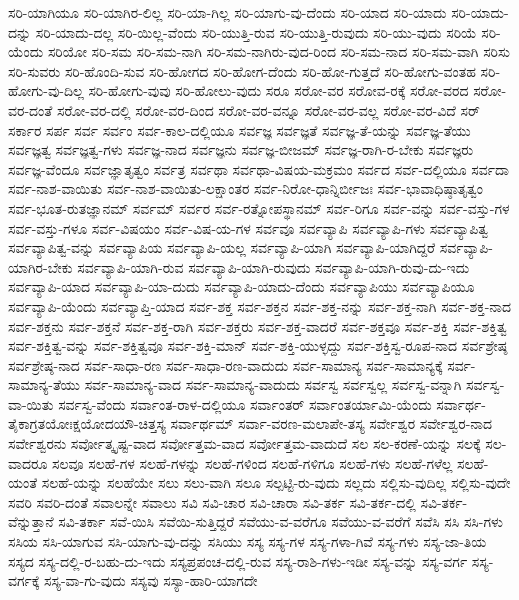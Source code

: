 {ಸರಿ-ಯಾಗಿಯೂ
ಸರಿ-ಯಾಗಿರ-ಲಿಲ್ಲ
ಸರಿ-ಯಾ-ಗಿಲ್ಲ
ಸರಿ-ಯಾಗು-ವು-ದೆಂದು
ಸರಿ-ಯಾದ
ಸರಿ-ಯಾದು
ಸರಿ-ಯಾದು-ದನ್ನು
ಸರಿ-ಯಾದು-ದಲ್ಲ
ಸರಿ-ಯಿಲ್ಲ-ವೆಂದು
ಸರಿ-ಯುತ್ತಿ-ರುವ
ಸರಿ-ಯುತ್ತಿ-ರುವುದು
ಸರಿ-ಯು-ವುದು
ಸರಿಯೆ
ಸರಿ-ಯೆಂದು
ಸರಿಯೋ
ಸರಿ-ಸಮ
ಸರಿ-ಸಮ-ನಾಗಿ
ಸರಿ-ಸಮ-ನಾಗಿರು-ವುದ-ರಿಂದ
ಸರಿ-ಸಮ-ನಾದ
ಸರಿ-ಸಮ-ವಾಗಿ
ಸರಿಸು
ಸರಿ-ಸುವರು
ಸರಿ-ಹೊಂದಿ-ಸುವ
ಸರಿ-ಹೋಗದ
ಸರಿ-ಹೋಗ-ದೆಂದು
ಸರಿ-ಹೋ-ಗುತ್ತದೆ
ಸರಿ-ಹೋಗು-ವಂತಹ
ಸರಿ-ಹೋಗು-ವು-ದಿಲ್ಲ
ಸರಿ-ಹೋಗು-ವುವು
ಸರಿ-ಹೋಲು-ವುದು
ಸರೂ
ಸರೋ-ವರ
ಸರೋವ-ರಕ್ಕೆ
ಸರೋ-ವರದ
ಸರೋ-ವರ-ದಂತೆ
ಸರೋ-ವರ-ದಲ್ಲಿ
ಸರೋ-ವರ-ದಿಂದ
ಸರೋ-ವರ-ವನ್ನೂ
ಸರೋ-ವರ-ವಲ್ಲ
ಸರೋ-ವರ-ವಿದೆ
ಸರ್
ಸರ್ಕಾರ
ಸರ್ಪ
ಸರ್ವ
ಸರ್ವಂ
ಸರ್ವ-ಕಾಲ-ದಲ್ಲಿಯೂ
ಸರ್ವಜ್ಞ
ಸರ್ವಜ್ಞತೆ
ಸರ್ವಜ್ಞ-ತೆ-ಯನ್ನು
ಸರ್ವಜ್ಞ-ತೆಯು
ಸರ್ವಜ್ಞತ್ವ
ಸರ್ವಜ್ಞತ್ವ-ಗಳು
ಸರ್ವಜ್ಞ-ನಾದ
ಸರ್ವಜ್ಞನು
ಸರ್ವಜ್ಞ-ಬೀಜಮ್
ಸರ್ವಜ್ಞ-ರಾಗಿ-ರ-ಬೇಕು
ಸರ್ವಜ್ಞರು
ಸರ್ವಜ್ಞ-ವೆಂದೂ
ಸರ್ವಜ್ಞಾತೃತ್ವಂ
ಸರ್ವತ್ರ
ಸರ್ವಥಾ
ಸರ್ವಥಾ-ವಿಷಯ-ಮಕ್ರಮಂ
ಸರ್ವದ
ಸರ್ವ-ದಲ್ಲಿಯೂ
ಸರ್ವದಾ
ಸರ್ವ-ನಾಶ-ವಾಯಿತು
ಸರ್ವ-ನಾಶ-ವಾಯಿತು-ಲಕ್ಷಾಂತರ
ಸರ್ವ-ನಿರೋ-ಧಾನ್ನಿರ್ಬೀಜಃ
ಸರ್ವ-ಭಾವಾಧಿಷ್ಠಾತೃತ್ವಂ
ಸರ್ವ-ಭೂತ-ರುತಜ್ಞಾನಮ್
ಸರ್ವಮ್
ಸರ್ವರ
ಸರ್ವ-ರತ್ನೋಪಸ್ಥಾನಮ್
ಸರ್ವ-ರಿಗೂ
ಸರ್ವ-ವನ್ನು
ಸರ್ವ-ವಸ್ತು-ಗಳ
ಸರ್ವ-ವಸ್ತು-ಗಳೂ
ಸರ್ವ-ವಿಷಯಂ
ಸರ್ವ-ವಿಷ-ಯ-ಗಳ
ಸರ್ವವೂ
ಸರ್ವವ್ಯಾಪಿ
ಸರ್ವವ್ಯಾಪಿ-ಗಳು
ಸರ್ವವ್ಯಾಪಿತ್ವ
ಸರ್ವವ್ಯಾಪಿತ್ವ-ವನ್ನು
ಸರ್ವವ್ಯಾಪಿಯ
ಸರ್ವವ್ಯಾಪಿ-ಯಲ್ಲ
ಸರ್ವವ್ಯಾಪಿ-ಯಾಗಿ
ಸರ್ವವ್ಯಾಪಿ-ಯಾಗಿದ್ದರೆ
ಸರ್ವವ್ಯಾಪಿ-ಯಾಗಿರ-ಬೇಕು
ಸರ್ವವ್ಯಾಪಿ-ಯಾಗಿ-ರುವ
ಸರ್ವವ್ಯಾಪಿ-ಯಾಗಿ-ರುವುದು
ಸರ್ವವ್ಯಾಪಿ-ಯಾಗಿ-ರುವು-ದು-ಇದು
ಸರ್ವವ್ಯಾಪಿ-ಯಾದ
ಸರ್ವವ್ಯಾಪಿ-ಯಾ-ದುದು
ಸರ್ವವ್ಯಾಪಿ-ಯಾದು-ದೆಂದು
ಸರ್ವವ್ಯಾಪಿಯು
ಸರ್ವವ್ಯಾಪಿಯೂ
ಸರ್ವವ್ಯಾಪಿ-ಯೆಂದು
ಸರ್ವವ್ಯಾಪ್ತಿ-ಯಾದ
ಸರ್ವ-ಶಕ್ತ
ಸರ್ವ-ಶಕ್ತನ
ಸರ್ವ-ಶಕ್ತ-ನನ್ನು
ಸರ್ವ-ಶಕ್ತ-ನಾಗಿ
ಸರ್ವ-ಶಕ್ತ-ನಾದ
ಸರ್ವ-ಶಕ್ತನು
ಸರ್ವ-ಶಕ್ತನೆ
ಸರ್ವ-ಶಕ್ತ-ರಾಗಿ
ಸರ್ವ-ಶಕ್ತರು
ಸರ್ವ-ಶಕ್ತ-ವಾದರೆ
ಸರ್ವ-ಶಕ್ತವೂ
ಸರ್ವ-ಶಕ್ತಿ
ಸರ್ವ-ಶಕ್ತಿತ್ವ
ಸರ್ವ-ಶಕ್ತಿತ್ವ-ವನ್ನು
ಸರ್ವ-ಶಕ್ತಿತ್ವವೂ
ಸರ್ವ-ಶಕ್ತಿ-ಮಾನ್
ಸರ್ವ-ಶಕ್ತಿ-ಯುಳ್ಳದ್ದು
ಸರ್ವ-ಶಕ್ತಿಸ್ವ-ರೂಪ-ನಾದ
ಸರ್ವಶ್ರೇಷ್ಠ
ಸರ್ವಶ್ರೇಷ್ಠ-ನಾದ
ಸರ್ವ-ಸಾಧಾ-ರಣ
ಸರ್ವ-ಸಾಧಾ-ರಣ-ವಾದುದು
ಸರ್ವ-ಸಾಮಾನ್ಯ
ಸರ್ವ-ಸಾಮಾನ್ಯಕ್ಕೆ
ಸರ್ವ-ಸಾಮಾನ್ಯ-ತೆಯು
ಸರ್ವ-ಸಾಮಾನ್ಯ-ವಾದ
ಸರ್ವ-ಸಾಮಾನ್ಯ-ವಾದುದು
ಸರ್ವಸ್ವ
ಸರ್ವಸ್ವಲ್ಲ
ಸರ್ವಸ್ವ-ವನ್ನಾಗಿ
ಸರ್ವಸ್ವ-ವಾ-ಯಿತು
ಸರ್ವಸ್ವ-ವೆಂದು
ಸರ್ವಾಂತ-ರಾಳ-ದಲ್ಲಿಯೂ
ಸರ್ವಾಂತರ್
ಸರ್ವಾಂತರ್ಯಾಮಿ-ಯೆಂದು
ಸರ್ವಾರ್ಥ-ತೈಕಾಗ್ರತಯೋಃಕ್ಷಯೋದಯೌ-ಚಿತ್ತಸ್ಯ
ಸರ್ವಾರ್ಥಮ್
ಸರ್ವಾ-ವರಣ-ಮಲಾಪೇ-ತಸ್ಯ
ಸರ್ವೇಶ್ವರ
ಸರ್ವೇಶ್ವರ-ನಾದ
ಸರ್ವೇಶ್ವರನು
ಸರ್ವೋತ್ಕೃಷ್ಟ-ವಾದ
ಸರ್ವೋತ್ತಮ-ವಾದ
ಸರ್ವೋತ್ತಮ-ವಾದುದೆ
ಸಲ
ಸಲ-ಕರಣೆ-ಯನ್ನು
ಸಲಕ್ಕೆ
ಸಲ-ವಾದರೂ
ಸಲವೂ
ಸಲಹೆ-ಗಳ
ಸಲಹೆ-ಗಳನ್ನು
ಸಲಹೆ-ಗಳಿಂದ
ಸಲಹೆ-ಗಳಿಗೂ
ಸಲಹೆ-ಗಳು
ಸಲಹೆ-ಗಳೆಲ್ಲ
ಸಲಹೆ-ಯಂತೆ
ಸಲಹೆ-ಯನ್ನು
ಸಲಹೆಯೇ
ಸಲು
ಸಲು-ವಾಗಿ
ಸಲೂ
ಸಲ್ಪಟ್ಟಿ-ರು-ವುದು
ಸಲ್ಲದು
ಸಲ್ಲಿಸು-ವುದಿಲ್ಲ
ಸಲ್ಲಿಸು-ವುದೇ
ಸವರಿ
ಸವರಿ-ದಂತೆ
ಸವಾಲನ್ನೇ
ಸವಾಲು
ಸವಿ
ಸವಿ-ಚಾರ
ಸವಿ-ಚಾರಾ
ಸವಿ-ತರ್ಕ
ಸವಿ-ತರ್ಕ-ದಲ್ಲಿ
ಸವಿ-ತರ್ಕ-ವೆನ್ನುತ್ತಾನೆ
ಸವಿ-ತರ್ಕಾ
ಸವೆ-ಯಿಸಿ
ಸವೆಯಿ-ಸುತ್ತಿದ್ದರೆ
ಸವೆಯು-ವ-ವರೆಗೂ
ಸವೆಯು-ವ-ವರೆಗೆ
ಸವೆಸಿ
ಸಸಿ
ಸಸಿ-ಗಳು
ಸಸಿಯ
ಸಸಿ-ಯಾಗುವ
ಸಸಿ-ಯಾಗು-ವು-ದನ್ನು
ಸಸಿಯು
ಸಸ್ಯ
ಸಸ್ಯ-ಗಳ
ಸಸ್ಯ-ಗಳಾ-ಗಿವೆ
ಸಸ್ಯ-ಗಳು
ಸಸ್ಯ-ಜಾ-ತಿಯ
ಸಸ್ಯದ
ಸಸ್ಯ-ದಲ್ಲಿ-ರ-ಬಹು-ದು-ಇದು
ಸಸ್ಯಪ್ರಪಂಚ-ದಲ್ಲಿ-ರುವ
ಸಸ್ಯ-ರಾಶಿ-ಗಳು-ಇಡೀ
ಸಸ್ಯ-ವನ್ನು
ಸಸ್ಯ-ವರ್ಗ
ಸಸ್ಯ-ವರ್ಗಕ್ಕೆ
ಸಸ್ಯ-ವಾ-ಗು-ವುದು
ಸಸ್ಯವು
ಸಸ್ಯಾ-ಹಾರಿ-ಯಾಗದೇ
}
